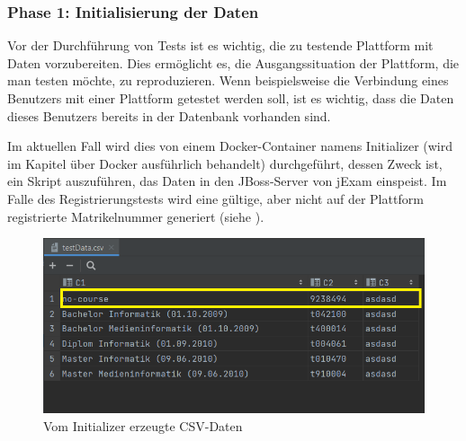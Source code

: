 \subsubsection{Phase 1: Initialisierung der Daten}

Vor der Durchführung von Tests ist es wichtig, die zu testende
Plattform mit Daten vorzubereiten. Dies ermöglicht es, die
Ausgangssituation der Plattform, die man testen möchte, zu
reproduzieren. Wenn beispielsweise die Verbindung eines Benutzers
mit einer Plattform getestet werden soll, ist es wichtig, dass die
Daten dieses Benutzers bereits in der Datenbank vorhanden sind.

Im aktuellen Fall wird dies von einem Docker-Container namens
Initializer (wird im Kapitel über Docker ausführlich behandelt)
durchgeführt, dessen Zweck  ist, ein Skript auszuführen, das Daten
in den JBoss-Server von jExam einspeist. Im Falle des
Registrierungstests wird eine gültige, aber nicht auf der
Plattform registrierte Matrikelnummer generiert (siehe ).

\begin{figure}[H]
    \centering
    \includegraphics[scale=0.7]{images/testData}
    \caption{Vom Initializer erzeugte CSV-Daten} \label{fig:testData}
\end{figure}